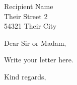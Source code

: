 \documentclass[11pt]{letter}
\begin{document}
\begin{letter}{Recipient Name \\ Their Street 2 \\ 54321 Their City}

\opening{Dear Sir or Madam,}

Write your letter here.

\closing{Kind regards,}

\end{letter}
\end{document}
